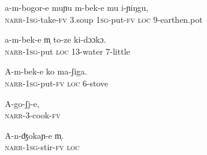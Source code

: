 \documentclass[output=paper]{LSP/langsci}
\begin{document}
 \begin{exe}
 \label{Saapp19}
\gll a-m-bogor-e muɲu m-bek-e mu i-ɲiŋgu,\\
\textsc{narr}-\textsc{1sg}-take-\textsc{fv}  \textsc{3}.soup    \textsc{1sg}-put-\textsc{fv}  \textsc{loc}  \textsc{9}-earthen.pot\\
\glt {}
\end{exe}

 \begin{exe}
 \label{Saapp20}
\gll a-m-bek-e m̩ to-ze ki-dɔɔkɔ.\\
\textsc{narr}-\textsc{1sg}-put  \textsc{loc}  \textsc{13}-water  \textsc{7}-little\\
\glt {}
\end{exe}

 \begin{exe}
 \label{Saapp21}
\gll A-m-bek-e ko ma-ʃiga.\\
\textsc{narr}-\textsc{1sg}-put-\textsc{fv}  \textsc{loc}  \textsc{6}-stove\\
\glt {}
\end{exe}

 \begin{exe}
 \label{Saapp22}
\gll A-go-ʃj-e,\\
\textsc{narr}-\textsc{3}-cook-\textsc{fv}\\
\glt {}
\end{exe}

 \begin{exe}
 \label{Saapp23}
\gll A-n-ʤokaɲ-e m̩.\\
\textsc{narr}-\textsc{1sg}-stir-\textsc{fv}  \textsc{loc}\\
\glt {}
\end{exe}
\end{document}
